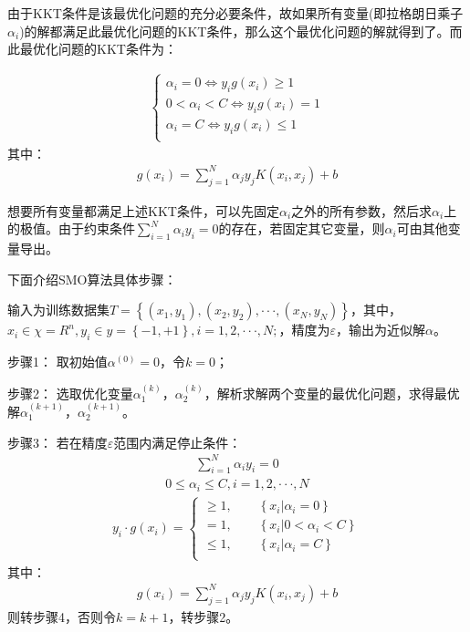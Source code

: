 \documentclass[12pt,a4paper]{article}%
\begin{document}
	由于KKT条件是该最优化问题的充分必要条件，故如果所有变量(即拉格朗日乘子${\alpha}_{i}$)的解都满足此最优化问题的KKT条件，那么这个最优化问题的解就得到了。而此最优化问题的KKT条件为：
	
	\begin{align}
		\begin{cases}
			{\alpha}_{i}=0\Leftrightarrow{y}_{i}g({x}_{i})\geq1
			\\ 0<{\alpha}_{i}<C\Leftrightarrow{y}_{i}g({x}_{i})=1  \\
			{\alpha}_{i}=C\Leftrightarrow{y}_{i}g({x}_{i})\leq1\\ \end{cases} 
	\end{align}
	其中：
	\begin{align}
		g({x}_{i})=\sum_{j=1}^{N} {{\alpha}_{j}{y}_{j}K({x}_{i},{x}_{j})}+b
	\end{align}
	
	想要所有变量都满足上述KKT条件，可以先固定${\alpha}_{i}$之外的所有参数，然后求${\alpha}_{i}$上的极值。由于约束条件$\sum_{i=1}^{N} {\alpha}_{i}{y}_{i}=0$的存在，若固定其它变量，则${\alpha}_{i}$可由其他变量导出。
	
	下面介绍SMO算法具体步骤：
	
	输入为训练数据集$T=\left\{({x}_{1},{y}_{1}),({x}_{2},{y}_{2}),···,({x}_{N},{y}_{N}) \right\}$，其中，${x}_{i}\in\chi={R}^{n},{y}_{i}\in y=\left\{-1,+1\right\},i=1,2,···,N;$，精度为$\varepsilon$，输出为近似解$\alpha$。
	
	步骤1：
	取初始值${\alpha}^{(0)}=0$，令$k=0$；
	
	步骤2：
	选取优化变量${\alpha}_{1}^{(k)}$，${\alpha}_{2}^{(k)}$，解析求解两个变量的最优化问题，求得最优解${\alpha}_{1}^{(k+1)}$，${\alpha}_{2}^{(k+1)}$。
	
	步骤3：
	若在精度$\varepsilon$范围内满足停止条件：
	\begin{align}
		\sum_{i=1}^{N} {\alpha}_{i}{y}_{i}=0
	\end{align}
	\begin{align}
		0\leq{\alpha}_{i}\leq C,i=1,2,···,N
	\end{align}
	\begin{align}
		{y}_{i}·g({x}_{i})=	\begin{cases}
			\geq1, \qquad \left\{{x}_{i}|{\alpha}_{i}=0 \right\}
			\\ =1, \qquad \left\{{x}_{i}|0<{\alpha}_{i}<C \right\} \\
			\leq1, \qquad \left\{{x}_{i}|{\alpha}_{i}=C \right\}\\ \end{cases} 
	\end{align}
	其中：
	\begin{align}
		g({x}_{i})=\sum_{j=1}^{N} {{\alpha}_{j}{y}_{j}K({x}_{i},{x}_{j})}+b
	\end{align}
	则转步骤4，否则令$k=k+1$，转步骤2。
	
\end{document}
